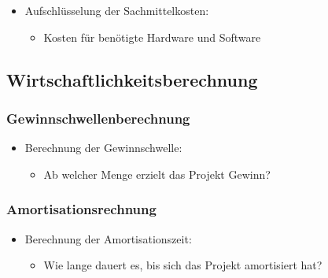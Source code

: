 \begin{itemize}
\item
  Aufschlüsselung der Sachmittelkosten:

  \begin{itemize}
  
  \item
    Kosten für benötigte Hardware und Software
  \end{itemize}
\end{itemize}

\subsection{Wirtschaftlichkeitsberechnung}\label{wirtschaftlichkeitsberechnung}

\subsubsection{Gewinnschwellenberechnung}\label{gewinnschwellenberechnung}

\begin{itemize}
\item
  Berechnung der Gewinnschwelle:

  \begin{itemize}
  
  \item
    Ab welcher Menge erzielt das Projekt Gewinn?
  \end{itemize}
\end{itemize}

\subsubsection{Amortisationsrechnung}\label{amortisationsrechnung}

\begin{itemize}
\item
  Berechnung der Amortisationszeit:

  \begin{itemize}
  
  \item
    Wie lange dauert es, bis sich das Projekt amortisiert hat?
  \end{itemize}
\end{itemize}